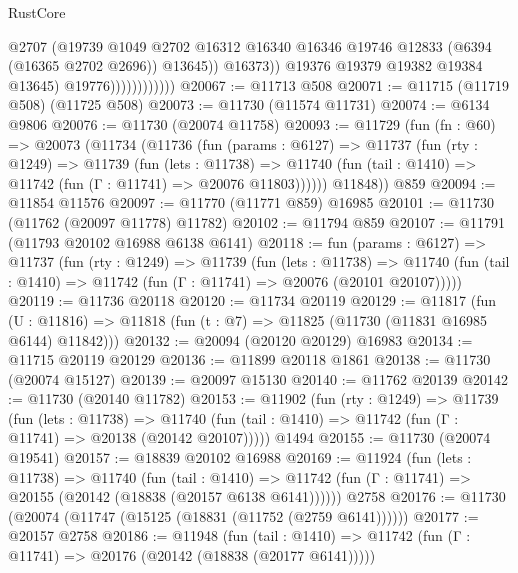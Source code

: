 \begin{lexlean}{RustCore}
\begin{coremodule}
                                    @2707
                                    (@19739
                                      @1049
                                      @2702
                                      @16312
                                      @16340
                                      @16346
                                      @19746
                                      @12833
                                      (@6394 (@16365 @2702 @2696))
                                      @13645))
                                  @16373))
                              @19376
                              @19379
                              @19382
                              @19384
                              @13645)
                            @19776))))))))))))
@20067 := @11713 @508
@20071 := @11715 (@11719 @508) (@11725 @508)
@20073 := @11730 (@11574 @11731)
@20074 := @6134 @9806
@20076 := @11730 (@20074 @11758)
@20093 := @11729
    (fun (fn : @60) =>
    @20073
      (@11734
        (@11736
          (fun (params : @6127) =>
          @11737
            (fun (rty : @1249) =>
            @11739
              (fun (lets : @11738) =>
              @11740 (fun (tail : @1410) => @11742 (fun (Γ : @11741) => @20076 @11803))))))
        @11848))
    @859
@20094 := @11854 @11576
@20097 := @11770 (@11771 @859) @16985
@20101 := @11730 (@11762 (@20097 @11778) @11782)
@20102 := @11794 @859
@20107 := @11791 (@11793 @20102 @16988 @6138 @6141)
@20118 := fun (params : @6127) =>
  @11737
    (fun (rty : @1249) =>
    @11739
      (fun (lets : @11738) =>
      @11740 (fun (tail : @1410) => @11742 (fun (Γ : @11741) => @20076 (@20101 @20107)))))
@20119 := @11736 @20118
@20120 := @11734 @20119
@20129 := @11817
    (fun (U : @11816) => @11818 (fun (t : @7) => @11825 (@11730 (@11831 @16985 @6144) @11842)))
@20132 := @20094 (@20120 @20129) @16983
@20134 := @11715 @20119 @20129
@20136 := @11899 @20118 @1861
@20138 := @11730 (@20074 @15127)
@20139 := @20097 @15130
@20140 := @11762 @20139
@20142 := @11730 (@20140 @11782)
@20153 := @11902
    (fun (rty : @1249) =>
    @11739
      (fun (lets : @11738) =>
      @11740 (fun (tail : @1410) => @11742 (fun (Γ : @11741) => @20138 (@20142 @20107)))))
    @1494
@20155 := @11730 (@20074 @19541)
@20157 := @18839 @20102 @16988
@20169 := @11924
    (fun (lets : @11738) =>
    @11740
      (fun (tail : @1410) =>
      @11742 (fun (Γ : @11741) => @20155 (@20142 (@18838 (@20157 @6138 @6141))))))
    @2758
@20176 := @11730 (@20074 (@11747 (@15125 (@18831 (@11752 (@2759 @6141))))))
@20177 := @20157 @2758
@20186 := @11948
    (fun (tail : @1410) => @11742 (fun (Γ : @11741) => @20176 (@20142 (@18838 (@20177 @6141)))))

\end{coremodule}
\end{lexlean}
